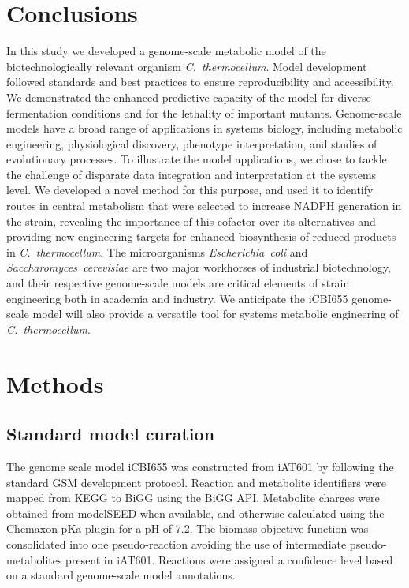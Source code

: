 \section{Conclusions}
In this study we developed a genome-scale metabolic model of the biotechnologically relevant organism \textit{C.~thermocellum}.
Model development followed standards and best practices to ensure reproducibility and accessibility.
We demonstrated the enhanced predictive capacity of the model for diverse fermentation conditions and for the lethality of important mutants.
Genome-scale models have a broad range of applications in systems biology, including metabolic engineering, physiological discovery, phenotype interpretation, and studies of evolutionary processes. \citep{feist2008, palsson2015} To illustrate the model applications, we chose to tackle the challenge of disparate data integration and interpretation at the systems level. We developed a novel method for this purpose, and used it to identify routes in central metabolism that were selected to increase NADPH generation in the  strain, revealing the importance of this cofactor over its alternatives and providing new engineering targets for enhanced biosynthesis of reduced products in \textit{C.~thermocellum}.
The microorganisms \textit{Escherichia~coli} and \textit{Saccharomyces~cerevisiae} are two major workhorses of industrial biotechnology, and their respective genome-scale models \citep{monk2017, lu2019} are critical elements of strain engineering both in academia\citep{blazeck2010} and industry.\citep{yim2011a}
We anticipate the iCBI655 genome-scale model will also provide a versatile tool for systems metabolic engineering of \textit{C.~thermocellum}.

\section{Methods}

\subsection{Standard model curation}
The genome scale model iCBI655 was constructed from  iAT601\citep{thompson2016} by following the standard GSM development
protocol.\citep{thiele2010}
Reaction and metabolite identifiers were mapped from KEGG to BiGG using the BiGG API.\citep{king2015}
Metabolite charges were obtained from modelSEED when available, and otherwise calculated using the Chemaxon pKa plugin\citep{szegezdi2007} for a pH of 7.2.\citep{thiele2010}
The biomass objective function was consolidated into one pseudo-reaction avoiding the use of intermediate pseudo-metabolites present in iAT601.
Reactions were assigned a confidence level based on a standard genome-scale model annotations.\citep{thiele2010}

